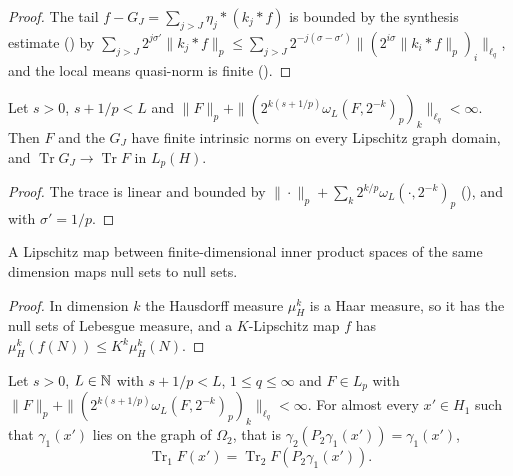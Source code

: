 \begin{proof}
\leanok
The tail $f - G_J = \sum_{j > J} \eta_j * (k_j * f)$ is bounded by the synthesis estimate
() by
$\sum_{j > J} 2^{j\sigma'} \|k_j * f\|_p \leq
\sum_{j > J} 2^{-j(\sigma - \sigma')} \|(2^{i\sigma} \|k_i * f\|_p)_i\|_{\ell_q}$, and the local
means quasi-norm is finite ().
\end{proof}

\begin{lemma}
\label{lem:trace-partial-sums}
\leanok
{}
Let $s > 0$, $s + 1/p < L$ and
$\|F\|_p + \|(2^{k(s + 1/p)} \omega_L(F, 2^{-k})_p)_k\|_{\ell_q} < \infty$. Then $F$ and the $G_J$
have finite intrinsic norms on every Lipschitz graph domain, and
$\operatorname{Tr} G_J \to \operatorname{Tr} F$ in $L_p(H)$.
\end{lemma}

\begin{proof}
\leanok
The trace is linear and bounded by $\|\cdot\|_p + \sum_k 2^{k/p} \omega_L(\cdot, 2^{-k})_p$
(), and  with $\sigma' = 1/p$.
\end{proof}

\begin{lemma}
\label{lem:lipschitz-null}
\leanok
A Lipschitz map between finite-dimensional inner product spaces of the same dimension maps null
sets to null sets.
\end{lemma}

\begin{proof}
\leanok
In dimension $k$ the Hausdorff measure $\mu_H^k$ is a Haar measure, so it has the null sets of
Lebesgue measure, and a $K$-Lipschitz map $f$ has $\mu_H^k(f(N)) \leq K^k \mu_H^k(N)$.
\end{proof}

\begin{theorem}
\label{thm:change-of-chart}
\leanok
{}
Let $s > 0$, $L \in \mathbb{N}$ with $s + 1/p < L$, $1 \leq q \leq \infty$ and $F \in L_p$ with
$\|F\|_p + \|(2^{k(s + 1/p)} \omega_L(F, 2^{-k})_p)_k\|_{\ell_q} < \infty$. For almost every
$x' \in H_1$ such that $\gamma_1(x')$ lies on the graph of $\Omega_2$, that is
$\gamma_2(P_2 \gamma_1(x')) = \gamma_1(x')$,
\[
  \operatorname{Tr}_1 F(x') = \operatorname{Tr}_2 F(P_2 \gamma_1(x')) .
\]
\end{theorem}

